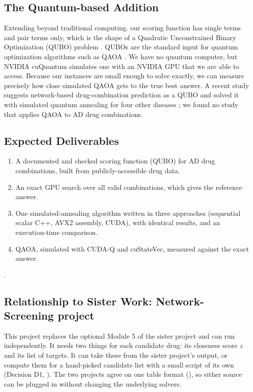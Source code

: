 \subsection{The Quantum-based Addition}
Extending beyond traditional computing. our scoring function has single terms and pair terms only, which is the shape of a Quadratic Unconstrained Binary Optimization (QUBO) problem \cite{glover2019tutorial,lucas2014ising}. QUBOs are the standard input for quantum optimization algorithms such as QAOA \cite{farhi2014qaoa}. We have no quantum computer, but NVIDIA cuQuantum \cite{bayraktar2023cuquantum} simulates one with an NVIDIA GPU that we are able to access. Because our instances are small enough to solve exactly, we can measure precisely how close simulated QAOA gets to the true best answer. A recent study suggests network-based drug-combination prediction as a QUBO and solved it with simulated quantum annealing for four other diseases \cite{ramos2025quantum}; we found no study that applies QAOA to AD drug combinations.

\subsection{Expected Deliverables}

\begin{enumerate}
\item A documented and checked scoring function (QUBO) for AD drug combinations, built from publicly-accessible drug data.
\item An exact GPU search over all valid combinations, which gives the reference answer.
\item One simulated-annealing algorithm written in three approaches (sequential scalar C++, AVX2 assembly, CUDA), with identical results, and an execution-time comparison.
\item QAOA, simulated with CUDA-Q and cuStateVec, measured against the exact answer.
\end{enumerate}.

\subsection{Relationship to Sister Work: Network-Screening project}

This project replaces the optional Module 5 of the sister project and can run independently. It needs two things for each candidate drug: its closeness score $z$ and its list of targets. It can take these from the sister project's output, or compute them for a hand-picked candidate list with a small script of its own (Decision D1, ). The two projects agree on one table format (), so either source can be plugged in without changing the underlying solvers.